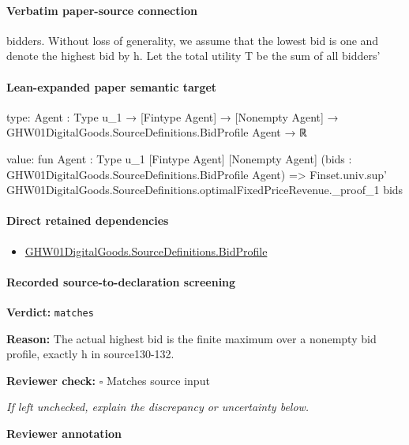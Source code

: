 \documentclass[10pt]{article}
\newcommand{\reviewerbox}{%
  \par\noindent\fbox{\parbox{0.96\linewidth}{\rule{0pt}{0.38in}}}\par
}
\newcommand{\reviewmatch}[1]{%
  \par\noindent\textbf{Reviewer check:} $\square$\; #1\par
  \noindent\emph{If left unchecked, explain the discrepancy or uncertainty below.}\par
}
\begin{document}
\paragraph{Verbatim paper-source connection}
\begin{ReviewVerbatim}
bidders. Without loss of generality, we assume that
the lowest bid is one and denote the highest bid by
h. Let the total utility T be the sum of all bidders’
\end{ReviewVerbatim}



\paragraph{Lean-expanded paper semantic target}
\begin{ReviewVerbatim}
type:
{Agent : Type u_1} → [Fintype Agent] → [Nonempty Agent] → GHW01DigitalGoods.SourceDefinitions.BidProfile Agent → ℝ

value:
fun {Agent : Type u_1} [Fintype Agent] [Nonempty Agent] (bids : GHW01DigitalGoods.SourceDefinitions.BidProfile Agent) =>
  Finset.univ.sup' GHW01DigitalGoods.SourceDefinitions.optimalFixedPriceRevenue._proof_1 bids
\end{ReviewVerbatim}

\paragraph{Direct retained dependencies}
\begin{itemize}\raggedright
\item \hyperlink{paper-prerequisite-ac8769d0dccf04f4}{GHW01\allowbreak{}Digital\allowbreak{}Goods.\allowbreak{}Source\allowbreak{}Definitions.\allowbreak{}Bid\allowbreak{}Profile}
\end{itemize}
\paragraph{Recorded source-to-declaration screening}
\textbf{Verdict:} \texttt{matches}
\\
{\raggedright
\textbf{Reason:} The actual highest bid is the finite maximum over a nonempty bid profile, exactly h in source130-\allowbreak{}132.\allowbreak{}
\par}
\reviewmatch{Matches source input}
\noindent\textbf{Reviewer annotation}\par
\reviewerbox
\clearpage
\hypertarget{paper-prerequisite-e6805388180d767a}{}
\end{document}
